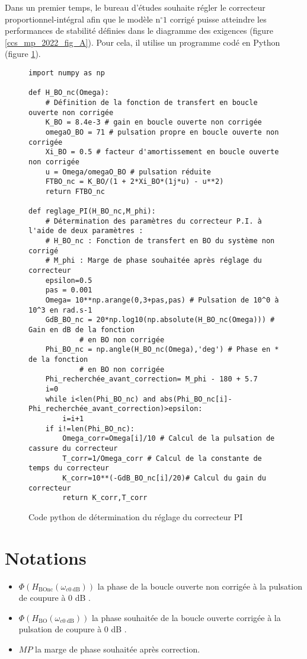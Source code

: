 \ifprof
\else
Dans un premier temps, le bureau d'études souhaite régler le correcteur proportionnel-intégral afin que le modèle $\mathrm{n}^{\circ} 1$ corrigé puisse atteindre les performances de stabilité définies dans le diagramme des exigences (figure \ref{ccs_mp_2022_fig_A}). Pour cela, il utilise un programme codé en Python (figure \ref{ccs_mp_2022_fig_10}).
\begin{figure}
\centering
\begin{lstlisting}
import numpy as np

def H_BO_nc(Omega):
    # Définition de la fonction de transfert en boucle ouverte non corrigée
    K_BO = 8.4e-3 # gain en boucle ouverte non corrigée
    omegaO_BO = 71 # pulsation propre en boucle ouverte non corrigée
    Xi_BO = 0.5 # facteur d'amortissement en boucle ouverte non corrigée
    u = Omega/omegaO_BO # pulsation réduite
    FTBO_nc = K_BO/(1 + 2*Xi_BO*(1j*u) - u**2)
    return FTBO_nc
    
def reglage_PI(H_BO_nc,M_phi):
    # Détermination des paramètres du correcteur P.I. à l'aide de deux paramètres :
    # H_BO_nc : Fonction de transfert en BO du système non corrigé
    # M_phi : Marge de phase souhaitée après réglage du correcteur
    epsilon=0.5
    pas = 0.001
    Omega= 10**np.arange(0,3+pas,pas) # Pulsation de 10^0 à 10^3 en rad.s-1
    GdB_BO_nc = 20*np.log10(np.absolute(H_BO_nc(Omega))) # Gain en dB de la fonction
            # en BO non corrigée
    Phi_BO_nc = np.angle(H_BO_nc(Omega),'deg') # Phase en * de la fonction
            # en BO non corrigée
    Phi_recherchée_avant_correction= M_phi - 180 + 5.7
    i=0
    while i<len(Phi_BO_nc) and abs(Phi_BO_nc[i]-Phi_recherchée_avant_correction)>epsilon:
        i=i+1
    if i!=len(Phi_BO_nc):
        Omega_corr=Omega[i]/10 # Calcul de la pulsation de cassure du correcteur
        T_corr=1/Omega_corr # Calcul de la constante de temps du correcteur
        K_corr=10**(-GdB_BO_nc[i]/20)# Calcul du gain du correcteur
        return K_corr,T_corr
\end{lstlisting}

\caption{\label{ccs_mp_2022_fig_10}Code python de détermination du réglage du correcteur PI}
\end{figure}

\section*{Notations}
\begin{itemize}
  \item $\Phi\left(H_{\mathrm{BOnc}}\left(\omega_{c 0 \mathrm{~dB}}\right)\right)$ la phase de la boucle ouverte non corrigée à la pulsation de coupure à 0 dB .
  \item $\Phi\left(H_{\mathrm{BO}}\left(\omega_{c 0 \mathrm{~dB}}\right)\right)$ la phase souhaitée de la boucle ouverte corrigée à la pulsation de coupure à 0 dB .
  \item $M P$ la marge de phase souhaitée après correction.
\end{itemize}
\fi


